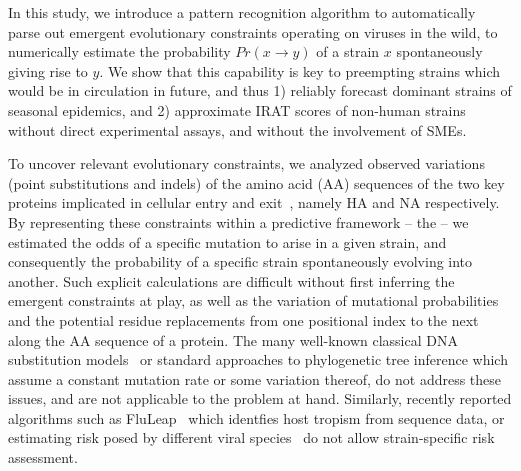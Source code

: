 \documentclass[onecolumn, compsoc,10pt]{IEEEtran}
\begin{document}

In this study, we introduce a pattern recognition algorithm to automatically parse out emergent evolutionary constraints operating on \infl viruses in the wild, to numerically estimate the probability $Pr(x \rightarrow y)$ of a strain $x$ spontaneously giving rise to  $y$. We show that this capability is key to preempting  strains which would be in circulation in future, and thus 1) reliably forecast dominant strains of seasonal epidemics, and 2) approximate IRAT scores of non-human strains without direct experimental assays, and without the involvement of SMEs.

To uncover relevant evolutionary constraints, we analyzed observed variations (point substitutions and indels) of the  amino acid (AA)  sequences  of the two key proteins implicated  in cellular entry and exit~\cite{gamblin2010influenza,shao2017evolution}, namely HA and NA respectively. By representing these constraints within a predictive framework -- the \enet -- we estimated the  odds of a specific mutation to arise in a given strain, and consequently the probability of a specific strain spontaneously  evolving into another.  Such explicit calculations are difficult  without first inferring the emergent constraints at play,  as well as  the variation of mutational probabilities and the potential residue replacements from one positional index to the next along the AA sequence of a protein. The many well-known classical  DNA  substitution models~\cite{posada1998modeltest} or standard approaches to phylogenetic tree inference which assume a constant mutation rate or some variation thereof, do not address these issues, and are not applicable to the problem at hand. Similarly, recently reported algorithms such  as FluLeap~\cite{eng2014predicting}  which identfies host tropism from sequence data, or estimating risk posed by different viral species~\cite{grange2021ranking} do not allow strain-specific risk assessment.
\end{document}
